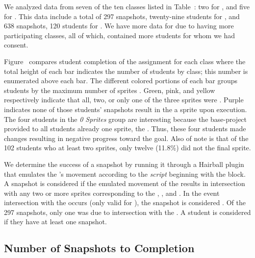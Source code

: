 We analyzed data from seven of the ten classes listed in
Table~: two for \sone{}, and five for \stwo{}. This
data include a total of 297 snapshots, twenty-nine students for \sone{}, and
638 snapshots, 120 students for \stwo{}. We have more data for \stwo{} due to
having more participating classes, all of which, contained more students for
whom we had consent.

Figure~ compares student completion of the
assignment for each class where the total height of each bar indicates the
number of students by class; this number is enumerated above each bar. The
different colored portions of each bar groups students by the maximum number of
sprites \caught{}. Green, pink, and yellow respectively indicate that all, two,
or only one of the three sprites were \caught{}. Purple indicates none of those
students' snapshots result in the \net{}  a sprite upon
execution. The four students in the \emph{0 Sprites} group are interesting
because the base-project provided to all students already  one
sprite, the \zebra{}. Thus, these four students made changes resulting in
negative progress toward the goal. Also of note is that of the 102 students who
\caught{} at least two sprites, only twelve (11.8\%) did not \catch{} the final
sprite.

We determine the success of a snapshot by running it through a Hairball plugin
that emulates the \net{}'s movement according to the \net{} \emph{script}
beginning with the \netclicked{} block. A snapshot is considered \com{} if the
emulated movement of the \net{} results in intersection with any two or more
sprites corresponding to the \bear{}, \horse{}, and \zebra{}. In the event
intersection with the \snake{} occurs (only valid for \sone{}), the snapshot is
considered \incom{}. Of the 297 \sone{} snapshots, only one was \incom{} due to
intersection with the \snake{}. A student is considered \com{} if they have at
least one \com{} snapshot.

\subsection{Number of Snapshots to Completion}

